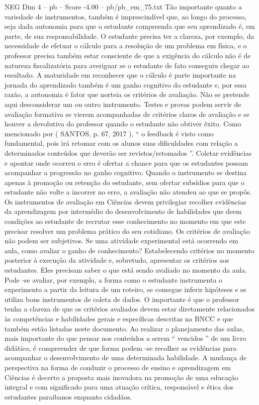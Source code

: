 \begin{textsample}{NEG Dim 4 – pb – Score -4.00 – pb/pb\_em\_75.txt}
Tão importante quanto a variedade de instrumentos, também é imprescindível que, ao longo do processo, seja dada autonomia para que o estudante compreenda que seu aprendizado é, em parte, de sua responsabilidade.
O estudante precisa ter a clareza, por exemplo, da necessidade de efetuar o cálculo para a resolução de um problema em física, e o professor precisa também estar consciente de que a exigência do cálculo não é de natureza fiscalizatória para averiguar se o estudante de fato conseguiu chegar ao resultado.
A maturidade em reconhecer que o cálculo é parte importante na jornada do aprendizado também é um ganho cognitivo do estudante e, por essa razão, a autonomia é fator que norteia os critérios de avaliação.
Não se pretende aqui desconsiderar um ou outro instrumento.
Testes e provas podem servir de avaliação formativa se vierem acompanhadas de critérios claros de avaliação e se houver a devolutiva do professor quando o estudante não obtiver êxito.
Como mencionado por ( SANTOS, p. 67, 2017 ), “ o feedback é visto como fundamental, pois irá retomar com os alunos suas dificuldades com relação a determinados conteúdos que deverão ser revistos/retomados ”.
Coletar evidências e apontar onde ocorreu o erro é ofertar a chance para que os estudantes possam acompanhar a progressão no ganho cognitivo.
Quando o instrumento se destina apenas à promoção ou retenção do estudante, sem ofertar subsídios para que o estudante não volte a incorrer no erro, a avaliação não atendeu ao que se propôs.
Os instrumentos de avaliação em Ciências devem privilegiar recolher evidências da aprendizagem por intermédio do desenvolvimento de habilidades que deem condições ao estudante de recrutar esse conhecimento no momento em que este precisar resolver um problema prático do seu cotidiano.
Os critérios de avaliação não podem ser subjetivos.
Se uma atividade experimental está ocorrendo em aula, como avaliar o ganho de conhecimento?
Estabelecendo critérios no momento posterior à execução da atividade e, sobretudo, apresentar os critérios aos estudantes.
Eles precisam saber o que está sendo avaliado no momento da aula.
Pode -se avaliar, por exemplo, a forma como o estudante instrumenta o experimento a partir da leitura de um roteiro, se consegue inferir hipóteses e se utiliza bons instrumentos de coleta de dados.
O importante é que o professor tenha a clareza de que os critérios avaliados devem estar diretamente relacionados às competências e habilidades gerais e específicas descritas na BNCC e que também estão listadas neste documento.
Ao realizar o planejamento das aulas, mais importante do que pensar nos conteúdos a serem “ vencidos ” de um livro didático, é compreender de que forma podem -se recolher as evidências para acompanhar o desenvolvimento de uma determinada habilidade.
A mudança de perspectiva na forma de conduzir o processo de ensino e aprendizagem em Ciências é decerto a proposta mais inovadora na promoção de uma educação integral e com significado para uma atuação crítica, responsável e ética dos estudantes paraibanos enquanto cidadãos.

\end{textsample}
